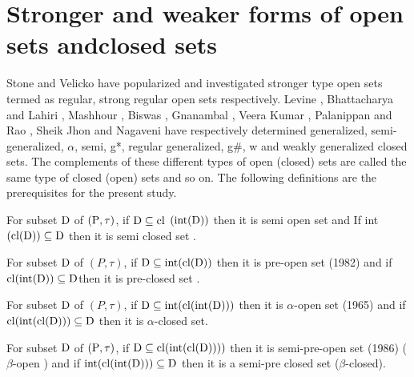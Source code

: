 \section{Stronger and weaker forms of open sets and\break closed sets}\label{sec1.2}

Stone \cite{Stone} and Velicko \cite{Velicko} have popularized and investigated stronger type open sets termed as regular, strong regular open sets respectively. Levine \cite{Levine}, Bhattacharya and Lahiri \cite{Bhattacharya}, Mashhour \cite{abd}, Biswas \cite{Biswas}, Gnanambal \cite{Gnanambal}, Veera Kumar \cite{Veerakumar}, Palanippan and Rao \cite{Palaniappan}, Sheik Jhon \cite{Sheik} and Nagaveni \cite{Nagaveni} have respectively determined generalized, semi-generalized, $\alpha$, semi, g*, regular generalized, g\#, w and weakly generalized closed sets. The complements of these different types of open (closed) sets are called the same type of closed (open) sets and so on. The following definitions are the prerequisites for the present study.

\begin{dfn}\label{dfn1.2.1}
For subset $\mathrm{D}$ of $(\mathrm{P}, \tau)$, if $\mathrm{D} \subseteq \mathrm{cl}$ $(\mbox{int} (\mathrm{D}))$ then it is semi open set and If int $(\mathrm{cl}(\mathrm{D})) \subseteq \mathrm{D}$ then it is semi closed set \cite{Levine1}.
\end{dfn}

\begin{dfn}\label{dfn1.2.2}
For subset $\mathrm{D}$ of $(P, \tau)$, if $\mathrm{D} \subseteq \mbox{int}(\mathrm{cl}(\mathrm{D}))$ then it is pre-open set (1982) and if $\mathrm{cl}(\mbox{int}(\mathrm{D})) \subseteq \mathrm{D}$then it is pre-closed set \cite{Arya1}. 
\end{dfn}

\begin{dfn}\label{dfn1.2.3}
For subset $\mathrm{D}$ of $(P, \tau)$, if $\mathrm{D} \subseteq\mbox{int} (\mathrm{cl}(\mbox{int}(\mathrm{D})))$ then it is $\alpha$-open set \cite{Njastad} (1965) and if $\mathrm{cl}(\mbox{int}(\mathrm{cl}(\mathrm{D})))\subseteq \mathrm{D}$ then it is $\alpha$-closed set.
\end{dfn}

\begin{dfn}\label{dfn1.2.4}
For subset $\mathrm{D}$ of $(\mathrm{P}, \tau)$, if $\mathrm{D} \subseteq \mathrm{cl}(\mbox{int}(\mathrm{cl}(\mathrm{D}))))$ then it is semi-pre-open set (1986) ($\beta$-open \cite{abd}) and if $\mbox{int}(\mathrm{cl}(\mbox{int}(\mathrm{D}))) \subseteq \mathrm{D}$ then it is a semi-pre closed set ($\beta$-closed). 
\end{dfn}

